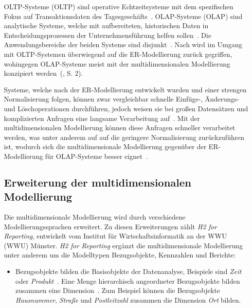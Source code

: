 \documentclass[
  language=german, %
  type=bachelor%
]{isthesis}
\begin{document}
\begin{content}
  \acrlong{OLTP}-Systeme (\acrshort{OLTP}) sind operative Echtzeitsysteme mit dem
  spezifischen Fokus auf Transaktionsdaten des Tagesgeschäfts~\cite[][S.
  11]{gabriel2009data}. \acrlong{OLAP}-Systeme (\acrshort{OLAP}) sind analytische Systeme,
  welche mit aufbereiteten, historischen Daten in Entscheidungsprozessen der
  Unternehmensführung helfen sollen~\cite[][S. 1]{chaudhuri1997overview}. Die
  Anwendungsbereiche der beiden Systeme sind disjunkt~\cite[][S.
  334]{chamoni2000line}. Nach \textsc{\citeauthor{phipps2002automating}} wird
  im Umgang mit \acrshort{OLTP}-Systemen überwiegend auf die ER-Modellierung
  zurück gegriffen, wohingegen \acrshort{OLAP}-Systeme meist mit der
  multidimensionalen Modellierung konzipiert werden~(\citeyear{phipps2002automating}, S. 2). 

  Systeme, welche nach der ER-Modellierung entwickelt wurden und einer strengen
  Normalisierung folgen, können zwar vergleichbar schnelle Einfüge-, Änderungs- und
  Löschoperationen durchführen, jedoch weisen sie bei großen Datensätzen und
  komplizierten Anfragen eine langsame Verarbeitung auf~\cite[][S.
  52]{ballard2012dimensional}. Mit der multidimensionalen Modellierung können diese
  Anfragen schneller verarbeitet werden, was unter anderem auf auf die geringere Normalisierung zurückzuführen ist, wodurch
  sich die multidimensionale Modellierung gegenüber der ER-Modellierung für
  \acrshort{OLAP}-Systeme besser eignet~\cite[][S.  52]{ballard2012dimensional}.


	\subsection{Erweiterung der multidimensionalen Modellierung}

	Die multidimensionale Modellierung wird durch verschiedene
	Modellierungssprachen erweitert. Zu diesen Erweiterungen zählt \textit{H2 for
	Reporting}, entwickelt vom Institut für Wirtschaftsinformatik an der
	\acrlong{WWU} (WWU) Münster. \textit{H2
	for Reporting} ergänzt die multidimensionale Modellierung unter anderem um
	die Modelltypen Bezugsobjekte, Kennzahlen und Berichte:

	\begin{itemize}

		\item Bezugsobjekte bilden die Basisobjekte der Datenanalyse, Beispiele
		sind \textit{Zeit} oder \textit{Produkt}~\cite[][S.  5]{becker2007h2}. Eine
		Menge hierarchisch angeordneter Bezugsobjekte bilden zusammen eine
		Dimension~\cite[][S.  88]{becker2012fachkonzeptionelle}. Zum Beispiel
		können die Bezugsobjekte \textit{Hausnummer}, \textit{Straße} und
		\textit{Postleitzahl} zusammen die Dimension \textit{Ort} bilden.


\end{itemize}
\end{content}
\end{document}
